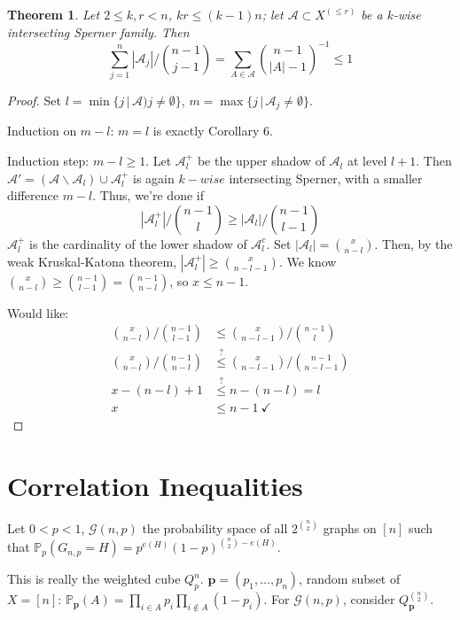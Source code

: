 \documentclass[a4paper]{article}
\newtheorem{theorem}{Theorem}
\newcommand*\abs[1]{\left|#1\right|}
\begin{document}
\begin{theorem}
	Let $2 \leq k,r < n$, $kr \leq (k-1)n$;
	let $\mathcal{A} \subset X^{(\leq r)}$ be a $k$-wise intersecting Sperner family.
	Then
	$$\sum_{j=1}^n \abs{\mathcal{A}_j} \bigg/ {n-1 \choose j-1} = \sum_{A \in \mathcal{A}} {n-1 \choose \abs{A}-1}^{-1} \leq 1$$
\end{theorem}
\begin{proof}
	Set $l = \min \{j \,|\, \mathcal{A})j \neq \emptyset\}$,
	$m = \max\{j \,|\, \mathcal{A}_j \neq \emptyset\}$.
	
	Induction on $m-l$: $m=l$ is exactly Corollary 6.
	
	Induction step: $m-l \geq 1$. Let $\mathcal{A}_l^+$ be the upper shadow of $\mathcal{A}_l$ at level $l+1$.
	Then $\mathcal{A}' = (\mathcal{A} \backslash \mathcal{A}_l) \cup \mathcal{A}_l^+$ is again $k-wise$ intersecting Sperner,
	with a smaller difference $m-l$. Thus, we're done if
	$$ \abs{\mathcal{A}_l^+} \bigg/ {n-1 \choose l} \geq \abs{\mathcal{A}_l} \bigg/ {n-1 \choose l-1} $$
	$\mathcal{A}_l^+$ is the cardinality of the lower shadow of $\mathcal{A}_l^c$.
	Set $\abs{\mathcal{A}_l} = {x \choose n-l}$.
	Then, by the weak Kruskal-Katona theorem,
	$\abs{\mathcal{A}_l^+} \geq {x \choose n-l-1}$.
	We know ${x \choose n-l} \geq {n-1 \choose l-1} = {n-1 \choose n-l}$, so $x \leq n-1$.
	
	Would like:
	\begin{align*}
		{x \choose n-l} \bigg/ {n-1 \choose l-1} &\leq {x \choose n-l-1} \bigg/ {n-1 \choose l} \\
		{x \choose n-l} \bigg/ {n-1 \choose n-l} &\overset{?}{\leq} {x \choose n-l-1} \bigg/ {n-1 \choose n-l-1} \\
		x-(n-l)+1 &\overset{?}{\leq} n-(n-l) = l \\
		x &\leq n-1\ \checkmark
	\end{align*}
\end{proof}

\section{Correlation Inequalities}
Let $0 < p < 1$, $\mathcal{G}(n,p)$ the probability space of all $2^{{n \choose 2}}$ graphs on $[n]$ such that
$\mathbb{P}_p(G_{n,p} = H) = p^{e(H)}(1-p)^{{n \choose 2} - e(H)}$.

This is really the weighted cube $Q_p^n$. $\mathbf{p} = (p_1, \dots, p_n)$, random subset of $X=[n]$:
$\mathbb{P}_\mathbf{p}(A) = \prod_{i \in A} p_i \prod_{i \not\in A}(1-p_i)$.
For $\mathcal{G}(n,p)$, consider $Q_\mathbf{p}^{{n \choose 2}}$.
\end{document}
